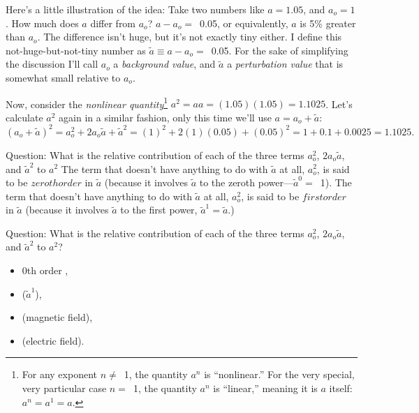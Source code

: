 Here's a little illustration of the idea: Take two numbers like $a = 1.05$, and
$a_o = 1$. How much does $a$ differ from $a_o$? $a - a_o =$~0.05, or
equivalently, $a$ is 5\% greater than $a_o$. The difference isn't huge, but it's
not exactly tiny either. I define this not-huge-but-not-tiny number as $ \tilde
a \equiv a - a_o =$~0.05. For the sake of simplifying the discussion I'll call
$a_o$ a \emph{background value}, and $\tilde a$ a \emph{perturbation value} that is
somewhat small relative to $a_o$.

Now, consider the \emph{nonlinear quantity}\footnote{For any exponent $n
  \neq$~1, the quantity $a^n$ is ``nonlinear.'' For the very special, very
  particular case $n =$~1, the quantity $a^n$ is ``linear,'' meaning it is $a$
  itself: $a^n = a^1 = a$.} $a^2 = a a = (1.05)(1.05) = 1.1025$. Let's calculate
$a^2$ again in a similar fashion, only this time we'll use $a = a_o + \tilde a$:
\begin{equation*}
  (a_o + \tilde a)^2 = a_o^2 + 2 a_o \tilde a + {\tilde a}^2 = (1)^2 + 2(1)(0.05) + (0.05)^2 = 1 + 0.1 + 0.0025 = 1.1025.
\end{equation*}

Question: What is the relative contribution of each of the three terms $a_o^2$,
$2 a_o \tilde a$, and $\tilde a^2$ to $a^2$ The term that doesn't have anything
to do with $\tilde a$ at all, $a_o^2$, is said to be $zeroth order$ in $\tilde
a$ (because it involves $\tilde a$ to the zeroth power---$\tilde a^0 =$~1). The
term that doesn't have anything to do with $\tilde a$ at all, $a_o^2$, is said
to be $first order$ in $\tilde a$ (because it involves $\tilde a$ to the first
power, $\tilde a^1 =\tilde a$.)

Question: What is the relative contribution of each of the three terms $a_o^2$,
$2 a_o \tilde a$, and $\tilde a^2$ to $a^2$?
\begin{itemize}
\item {} 0th order  ,
\item {} ($\tilde a^1$),
\item {} (magnetic field),
\item {} (electric field).
\end{itemize}


